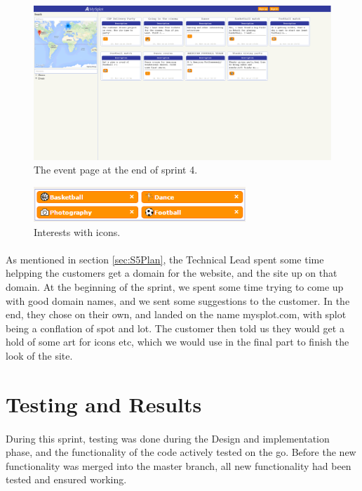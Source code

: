 \begin{figure}[ht!]
  \centering
  \includegraphics[width=\linewidth]{./img/webpage/3Nov/FrontpageEvents}
  \caption{The event page at the end of sprint 4.}
  \label{fig:S5DesignImplFrontEvents3Nov}
\end{figure}

\begin{figure}[ht!]
  \centering
  \includegraphics[width=80mm]{./Sprint5/img/InterestIcons}
  \caption{Interests with icons.}
  \label{fig:S5DesignImplInterestIcons}
\end{figure}

\paragraph{} As mentioned in section \ref{sec:S5Plan}, the Technical Lead spent some time helpping the customers get a domain for the website, and the site up on that domain. At the beginning of the sprint, we spent some time trying to come up with good domain names, and we sent some suggestions to the customer. In the end, they chose on their own, and landed on the name mysplot.com, with splot being a conflation of spot and lot. The customer then told us they would get a hold of some art for icons etc, which we would use in the final part to finish the look of the site.


\section{Testing and Results}
\label{sec:S5Testing}
\paragraph{} During this sprint, testing was done during the Design and implementation phase, and the functionality of the code actively tested on the go. Before the new functionality was merged into the master branch, all new functionality had been tested and ensured working. 

